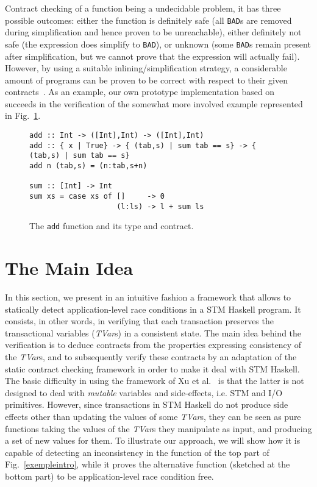 \documentclass[submission,copyright,creativecommons]{eptcs}
\begin{document}
Contract checking of a function being a undecidable problem, it has three possible outcomes: either the function is definitely safe (all \texttt{BAD}s are removed during simplification and hence proven to be unreachable), either definitely not safe (the expression does simplify to \texttt{BAD}), or unknown (some \texttt{BAD}s remain present after simplification, but we cannot prove that the expression will actually fail). However, by using a suitable inlining/simplification
strategy, a considerable amount of programs can be proven to be correct with respect to their given contracts~\cite{static-contract-checking}. As an example, our own prototype implementation based on~\cite{static-contract-checking} succeeds in the verification of the somewhat more involved example represented in Fig.~\ref{fig:addpure}.


\begin{figure}[htb]
  \centering
  \begin{footnotesize}
\begin{verbatim}
add :: Int -> ([Int],Int) -> ([Int],Int)
add :: { x | True} -> { (tab,s) | sum tab == s} -> { (tab,s) | sum tab == s} 
add n (tab,s) = (n:tab,s+n)

sum :: [Int] -> Int
sum xs = case xs of []     -> 0
                    (l:ls) -> l + sum ls
\end{verbatim}
  \end{footnotesize}
  \caption{The \texttt{add} function and its type and contract.}
  \label{fig:addpure}
\end{figure}



\section{The Main Idea}
\label{idea}

In this section, we present in an intuitive fashion 
a framework
that allows to statically detect application-level race conditions in a STM Haskell program. It consists, in other words, in verifying that each transaction preserves the transactional variables (\emph{TVar}s) in a consistent state.
The main idea behind the verification is to deduce contracts from the properties expressing consistency of the \emph{TVar}s, and to subsequently verify these contracts by an adaptation of the static contract checking framework in order to make it deal with STM Haskell.
The basic difficulty in using the framework of Xu et al.~\cite{static-contract-checking} is that the latter is not designed to deal with \emph{mutable} variables and side-effects, i.e. STM and I/O primitives. However, since transactions in STM Haskell do not produce side effects other than updating the values of some \emph{TVar}s, they can be seen as pure functions taking the values of the \emph{TVar}s they manipulate as input, and producing a set of new values for them. 
To illustrate our approach, we will show how it is capable of detecting an inconsistency in the function of the top part of Fig.~\ref{exempleintro}, while it proves the alternative function (sketched at the bottom part) to be application-level race condition free.
\end{document}
